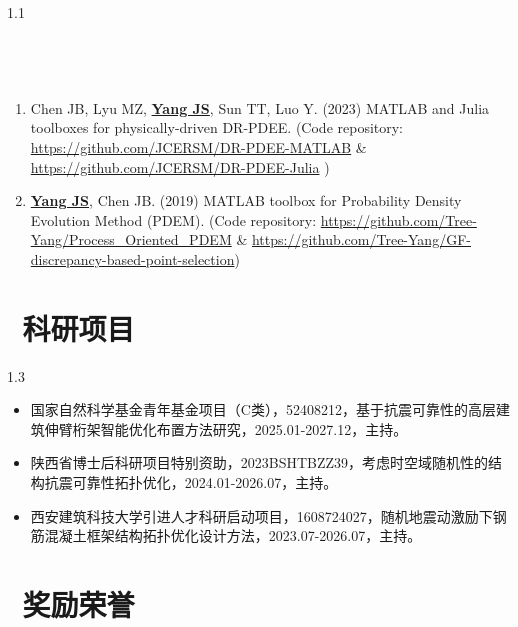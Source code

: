 \documentclass{resume}
\begin{document}
\begin{spacing}{1.1}
\subsection{\faFileCode\;\, }
\vspace{10pt}
\begin{enumerate}[itemsep=5pt,topsep=2pt]
  \item Chen JB, Lyu MZ, \underline{\textbf{Yang JS}}, Sun TT, Luo Y. (2023) MATLAB and Julia toolboxes for physically-driven DR-PDEE. (Code repository: \url{https://github.com/JCERSM/DR-PDEE-MATLAB} \& \url{https://github.com/JCERSM/DR-PDEE-Julia} )
  
  \item \underline{\textbf{Yang JS}}, Chen JB. (2019) MATLAB toolbox for Probability Density Evolution Method (PDEM). (Code repository: \url{https://github.com/Tree-Yang/Process_Oriented_PDEM} \& \url{https://github.com/Tree-Yang/GF-discrepancy-based-point-selection})

\end{enumerate}
\end{spacing}


\section{\faArchive\;\, 科研项目}
 \begin{spacing}{1.3}
    \begin{itemize}
    \item 国家自然科学基金青年基金项目（C类），52408212，基于抗震可靠性的高层建筑伸臂桁架智能优化布置方法研究，2025.01-2027.12，主持。
    \item 陕西省博士后科研项目特别资助，2023BSHTBZZ39，考虑时空域随机性的结构抗震可靠性拓扑优化，2024.01-2026.07，主持。
    \item 西安建筑科技大学引进人才科研启动项目，1608724027，随机地震动激励下钢筋混凝土框架结构拓扑优化设计方法，2023.07-2026.07，主持。
    \end{itemize}
 \end{spacing}

\section{\faAward\;\, 奖励荣誉}
\end{document}
